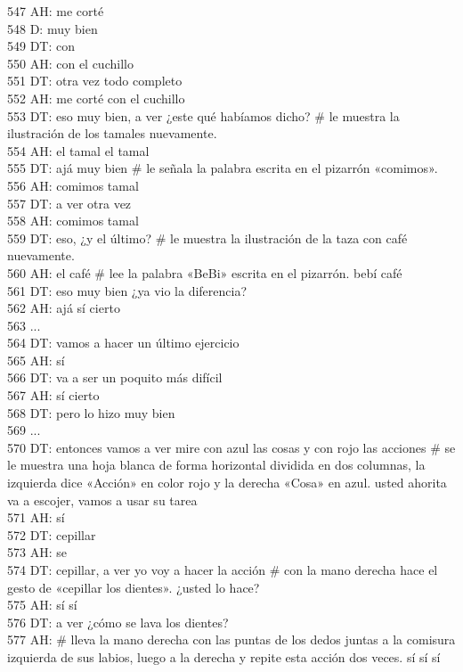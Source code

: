 547 AH: me corté\\
548 D: muy bien\\
549 DT: con\\
550 AH: con el cuchillo\\
551 DT: otra vez todo completo\\
552 AH: me corté con el cuchillo\\
553 DT: eso muy bien, a ver ¿este qué habíamos dicho? # le muestra la ilustración  de los tamales nuevamente.\\
554 AH: el tamal el tamal\\
555 DT: ajá muy bien # le señala la palabra escrita en el pizarrón «comimos».\\
556 AH: comimos tamal\\
557 DT: a ver otra vez\\
558 AH: comimos tamal\\
559 DT: eso, ¿y el último? # le muestra la ilustración de la taza con café nuevamente.\\
560 AH: el café # lee la palabra «BeBi» escrita en el pizarrón. bebí café\\
561 DT: eso muy bien ¿ya vio la diferencia?\\
562 AH: ajá sí cierto\\
563 ...\\
564 DT: vamos a hacer un último ejercicio\\
565 AH: sí\\
566 DT: va a ser un poquito más difícil\\
567 AH: sí cierto\\
568 DT: pero lo hizo muy bien\\
569 ...\\
570 DT: entonces vamos a ver mire con azul las cosas y con rojo las acciones # se le muestra una hoja blanca de forma horizontal dividida en dos columnas, la izquierda dice «Acción» en color rojo y la derecha «Cosa» en azul. usted ahorita va a escojer, vamos a usar su tarea\\
571 AH: sí\\
572 DT: cepillar\\
573 AH: se\\
574 DT: cepillar, a ver yo voy a hacer la acción # con la mano derecha hace el gesto de «cepillar los dientes». ¿usted lo hace?\\
575 AH: sí sí\\
576 DT: a ver ¿cómo se lava los dientes?\\
577 AH: # lleva la mano derecha con las puntas de los dedos juntas a la comisura izquierda de sus labios, luego a la derecha y repite esta acción dos veces. sí sí sí\\
